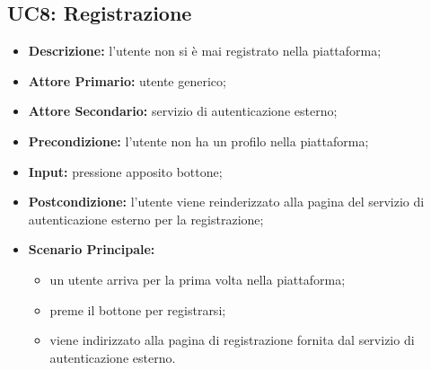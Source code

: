 \subsection{UC8: Registrazione}
\label{sec:UC8}
\begin{itemize}
    \item \textbf{Descrizione:} l'utente non si è mai registrato nella piattaforma;
    \item \textbf{Attore Primario:} utente generico;
    \item \textbf{Attore Secondario:} servizio di autenticazione esterno;
    \item \textbf{Precondizione:} l'utente non ha un profilo nella piattaforma;
    \item \textbf{Input:} pressione apposito bottone;
    \item \textbf{Postcondizione:} l'utente viene reinderizzato alla pagina  del servizio di autenticazione esterno per la registrazione;
    \item \textbf{Scenario Principale:}
          \begin{itemize}
              \item un utente arriva per la prima volta nella piattaforma;
              \item preme il bottone per registrarsi;
              \item viene indirizzato alla pagina di registrazione fornita dal servizio di autenticazione esterno.
          \end{itemize}
\end{itemize}